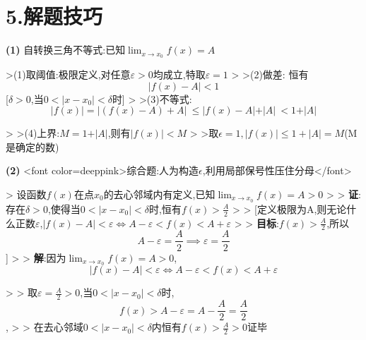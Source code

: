 \documentclass[11pt,a4paper,UTF8]{ctexart}
\begin{document}
\section{5.解题技巧}

\textbf{(1)} 自转换三角不等式:已知$\lim_{x \to x_0} f(x) = A$

\begin{solbox}[{分步推导与答题规范}]
    >(1)取阈值:极限定义,对任意$\varepsilon > 0$均成立,特取$\varepsilon = 1$
    >
    >(2)做差:  恒有
\begin{equation*}
\vert{}f(x) - A\vert{} < 1
\end{equation*}
	[$\delta > 0$,当$0 < \vert{}x - x_0\vert{} < \delta$时]
    >
    >(3)不等式:
\begin{equation*}
\vert{}f(x)\vert{} = \vert{}(f(x) - A) + A\vert{} \ \le \vert{}f(x) - A\vert{} + \vert{}A\vert{} \ < 1 + \vert{}A\vert{}
\end{equation*}

    >
    >(4)上界:$M = 1 + \vert{}A\vert{}$,则有$\vert{}f(x)\vert{} < M$
    >
    >取$\epsilon=1,|f(x)|\leq 1+|A| = M$(M是确定的数)
\end{solbox}

\textbf{(2)} \textit{}<font color=deeppink>综合题:人为构造$\epsilon$,利用局部保号性压住分母</font>\textit{}

\begin{solbox}[{分步推导与答题规范}]
    >   设函数$f(x)$在点$x_0$的去心邻域内有定义,已知$\lim_{x \to x_0} f(x) = A > 0$
    >
    >   \textbf{证}:存在$\delta > 0$,使得当$0 < \vert{}x - x_0\vert{} < \delta$时,恒有$f(x) > \frac{A}{2}$
    >
    >   [定义极限为A,则无论什么正数$\varepsilon$,$\vert{}f(x) - A\vert{} < \varepsilon \iff A - \varepsilon < f(x) < A + \varepsilon$
    >
    >   \textbf{目标}:$f(x) > \frac{A}{2}$,所以
\begin{equation*}
A - \varepsilon = \frac{A}{2} \implies \varepsilon = \frac{A}{2}
\end{equation*}
]
    >
    >   \textbf{解}:因为$\lim_{x \to x_0} f(x) = A > 0$,
\begin{equation*}
\vert{}f(x) - A\vert{} < \varepsilon \iff A - \varepsilon < f(x) < A + \varepsilon
\end{equation*}

    >
    >   取$\varepsilon = \frac{A}{2} > 0$,当$0 < \vert{}x - x_0\vert{} < \delta$时,
\begin{equation*}
f(x) > A - \varepsilon = A - \frac{A}{2} = \frac{A}{2}
\end{equation*}
,
    >
    >   在去心邻域$0 < \vert{}x - x_0\vert{} < \delta$内恒有$f(x) > \frac{A}{2} > 0$证毕
\end{solbox}
\end{document}
